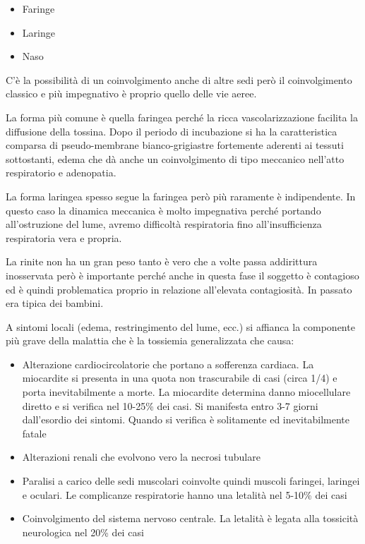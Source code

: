 \begin{itemize}
\item
  Faringe
\item
  Laringe
\item
  Naso
\end{itemize}
  C'è la possibilità di un coinvolgimento anche di altre sedi però il
  coinvolgimento classico e più impegnativo è proprio quello delle vie
  aeree.

  La forma più comune è quella faringea perché la ricca
  vascolarizzazione facilita la diffusione della tossina. Dopo il
  periodo di incubazione si ha la caratteristica comparsa di
  pseudo-membrane bianco-grigiastre fortemente aderenti ai tessuti
  sottostanti, edema che dà anche un coinvolgimento di tipo meccanico
  nell'atto respiratorio e adenopatia.

  La forma laringea spesso segue la faringea però più raramente è
  indipendente. In questo caso la dinamica meccanica è molto impegnativa
  perché portando all'ostruzione del lume, avremo difficoltà
  respiratoria fino all'insufficienza respiratoria vera e propria.

  La rinite non ha un gran peso tanto è vero che a volte passa
  addirittura inosservata però è importante perché anche in questa fase
  il soggetto è contagioso ed è quindi problematica proprio in relazione
  all'elevata contagiosità. In passato era tipica dei bambini.

  A sintomi locali (edema, restringimento del lume, ecc.) si affianca la
  componente più grave della malattia che è la tossiemia generalizzata
  che causa:

\begin{itemize}
\item
  Alterazione cardiocircolatorie che portano a sofferenza cardiaca. La
  miocardite si presenta in una quota non trascurabile di casi (circa 1/4)
  e porta inevitabilmente a morte. La miocardite determina danno
  miocellulare diretto e si verifica nel 10-25\% dei casi. Si manifesta
  entro 3-7 giorni dall'esordio dei sintomi. Quando si verifica è
  solitamente ed inevitabilmente fatale
\item
  Alterazioni renali che evolvono vero la necrosi tubulare
\item
  Paralisi a carico delle sedi muscolari coinvolte quindi muscoli
  faringei, laringei e oculari. Le complicanze respiratorie hanno una
  letalità nel 5-10\% dei casi
\item
  Coinvolgimento del sistema nervoso centrale. La letalità è legata alla
  tossicità neurologica nel 20\% dei casi
\end{itemize}

